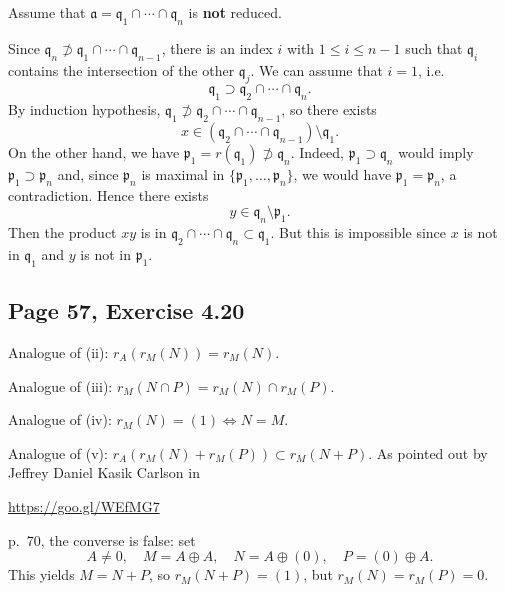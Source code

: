 \documentclass[parskip=half,fontsize=12pt]{scrartcl}%
\newcommand{\mf}{\mathfrak}
\newcommand{\ppp}{\mf p}
\newcommand{\qqq}{\mf q}
\begin{document}
Assume that $\mathfrak{a}=\mathfrak{q}_1\cap\cdots\cap\mathfrak{q}_n$ is \textbf{not} reduced. %

Since $\mathfrak{q}_n\not\supset\mathfrak{q}_1\cap\cdots\cap\mathfrak{q}_{n-1}$, there is an index $i$ with $1\leq i\leq n-1$ such that $\mathfrak{q}_i$ contains the intersection of the other $\qqq_j$. We can assume that $i=1$, i.e. 
$$
\mathfrak{q}_1\supset\mathfrak{q}_2\cap\cdots\cap\mathfrak{q}_n.
$$ 
By induction hypothesis, $\mathfrak{q}_1\not\supset\mathfrak{q}_2\cap\cdots\cap\mathfrak{q}_{n-1}$, so there exists 
$$
x\in(\mathfrak{q}_2\cap\cdots\cap\mathfrak{q}_{n-1})\setminus\mathfrak{q}_1.
$$ 
On the other hand, we have $\mathfrak{p}_1=r(\mathfrak{q}_1)\not \supset \mathfrak{q}_n$. Indeed, $\mathfrak{p}_1\supset \mathfrak{q}_n$ would imply $\mathfrak{p}_1\supset \mathfrak{p}_n$ and, since $\mathfrak{p}_n$ is maximal in $\{\mathfrak{p}_1,\dots,\mathfrak{p}_n\}$, we would have $\mathfrak{p}_1=\mathfrak{p}_n$, a contradiction. Hence there exists 
$$
y\in\mathfrak{q}_n\setminus\mathfrak{p}_1.
$$ 
Then the product $xy$ is in $\mathfrak{q}_2\cap\cdots\cap\mathfrak{q}_n\subset\mathfrak{q}_1$. But this is impossible since $x$ is not in $\qqq_1$ and $y$ is not in $\ppp_1$. %

\subsection{Page 57, Exercise 4.20}%

Analogue of (ii): $r_A(r_M(N))=r_M(N)$. 

Analogue of (iii): $r_M(N\cap P)=r_M(N)\cap r_M(P)$. 

Analogue of (iv): $r_M(N)=(1)\iff N=M$.

Analogue of (v): $r_A(r_M(N)+r_M(P))\subset r_M(N+P)$. As pointed out by Jeffrey Daniel Kasik Carlson in\medskip 

\centerline{\href{https://goo.gl/WEfMG7}{https://goo.gl/WEfMG7}}

p.~70, the converse is false: set 
$$
A\ne0,\quad M=A\oplus A,\quad N=A\oplus(0),\quad P=(0)\oplus A.
$$ 
This yields $M=N+P$, so $r_M(N+P)=(1)$, but $r_M(N)=r_M(P)=0$. %
\end{document}
